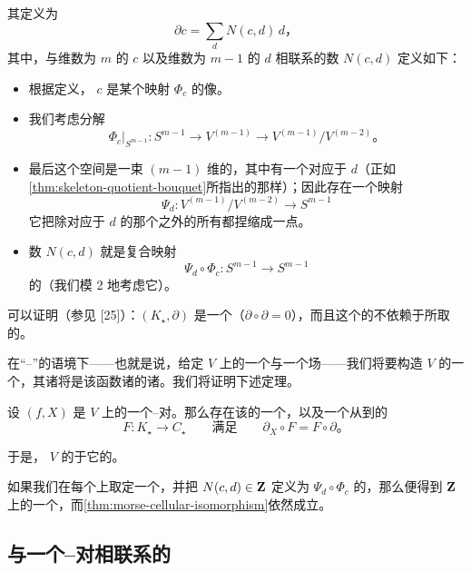 其\trDifferential{}定义为
\[
\partial c=\sum_d N(c,d)\,d\text{，}
\]
其中，与维数为 $m$ 的\trCellular{} $c$ 以及维数为 $m-1$ 的\trCellular{} $d$ 相联系的数 $N(c,d)$ 定义如下：
\begin{itemize}
\item 根据定义，\trCellular{} $c$ 是某个映射 $\varPhi_c$ 的像。
\item 我们考虑分解
\[
\varPhi_c\big|_{S^{m-1}}\colon S^{m-1}\longrightarrow V^{(m-1)}\longrightarrow V^{(m-1)}/V^{(m-2)}\text{。}
\]
\item 最后这个空间是一束 $(m-1)$ 维的\trSphere，其中有一个\trSphere{}对应于\trCellular{} $d$（正如\cref{thm:skeleton-quotient-bouquet}所指出的那样）；因此存在一个映射
\[
\varPsi_d\colon V^{(m-1)}/V^{(m-2)}\longrightarrow S^{m-1}
\]
它把除对应于 $d$ 的那个\trSphere{}之外的所有\trSphere{}都捏缩成一点。
\item 数 $N(c,d)$ 就是复合映射
\[
\varPsi_d\circ\varPhi_c\colon S^{m-1}\longrightarrow S^{m-1}
\]
的\trMappingDegree（我们模 2 地考虑它）。
\end{itemize}

可以证明（参见 [25]）：$(K_\star,\partial)$ 是一个\trComplex（$\partial\circ\partial=0$），而且这个\trComplex{}的\trHomology{}不依赖于所取的\trCellularDecomposition。

在“\trMorse--\trSmale”的语境下——也就是说，给定\trManifold{} $V$ 上的一个\trMorseFunction{}与一个\trPseudogradient{}场——我们将要构造 $V$ 的一个\trCellularDecomposition，其诸\trCellular{}将是该函数诸\trCriticalPoint{}的诸\trUnstableManifold。我们将证明下述定理。

\begin{theorem}\label{thm:morse-cellular-isomorphism}
设 $(f,X)$ 是\trManifold{} $V$ 上的一个\trMorse--\trSmale{}对。那么存在该\trManifold{}的一个\trCellularDecomposition，以及一个从\trCellular\trComplex{}到\trMorseComplex{}的\trIsomorphism
\[
F:K_\star\longrightarrow C_\star\qquad\text{满足}\qquad \partial_X\circ F=F\circ\partial\text{。}
\]
\end{theorem}

于是，\trManifold{} $V$ 的\trMorseHomology{}\trIsomorphic{}于它的\trCellularHomology{}。

如果我们在每个\trCellular{}上取定一个\trOrientation，并把 $N(c,d)\in\mathbf{Z}$ 定义为 $\varPsi_d\circ\varPhi_c$ 的\trMappingDegree，那么便得到 $\mathbf{Z}$ 上的一个\trComplex，而\cref{thm:morse-cellular-isomorphism}依然成立。

\subsection{与一个\trMorse--\trSmale{}对相联系的\trCellularDecomposition}
\label{subsec:cellular-decomposition-morse-smale}

